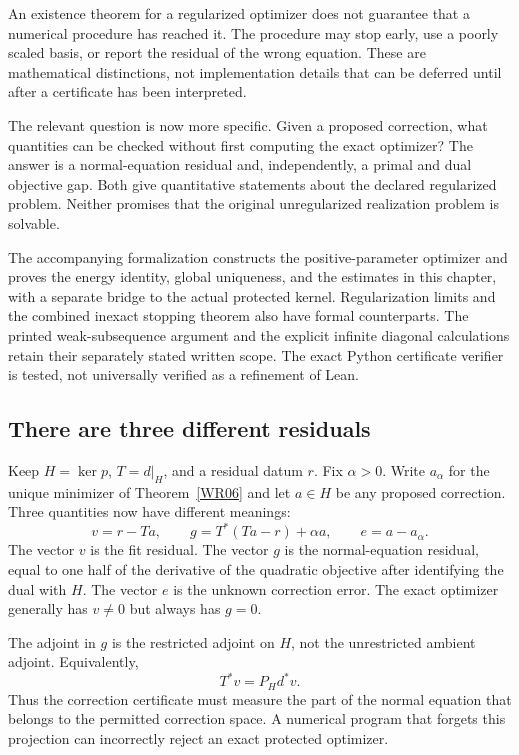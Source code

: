 \label{sec:inexact-repair}
An existence theorem for a regularized optimizer does not guarantee that a numerical procedure has reached it. The procedure may stop early, use a poorly scaled basis, or report the residual of the wrong equation. These are mathematical distinctions, not implementation details that can be deferred until after a certificate has been interpreted.

The relevant question is now more specific. Given a proposed correction, what quantities can be checked without first computing the exact optimizer? The answer is a normal-equation residual and, independently, a primal and dual objective gap. Both give quantitative statements about the declared regularized problem. Neither promises that the original unregularized realization problem is solvable.

\begin{scopebox}
The accompanying formalization constructs the positive-parameter optimizer and proves the energy identity, global uniqueness, and the estimates in this chapter, with a separate bridge to the actual protected kernel. Regularization limits and the combined inexact stopping theorem also have formal counterparts. The printed weak-subsequence argument and the explicit infinite diagonal calculations retain their separately stated written scope. The exact Python certificate verifier is tested, not universally verified as a refinement of Lean.
\end{scopebox}

\subsection{There are three different residuals}
Keep $H=\ker p$, $T=d|_H$, and a residual datum $r$. Fix $\alpha>0$. Write $a_\alpha$ for the unique minimizer of Theorem~\ref{WR06} and let $a\in H$ be any proposed correction. Three quantities now have different meanings:
\[
 v=r-Ta,\qquad
 g=T^*(Ta-r)+\alpha a,\qquad
 e=a-a_\alpha.
\]
The vector $v$ is the fit residual. The vector $g$ is the normal-equation residual, equal to one half of the derivative of the quadratic objective after identifying the dual with $H$. The vector $e$ is the unknown correction error. The exact optimizer generally has $v\ne0$ but always has $g=0$.

The adjoint in $g$ is the restricted adjoint on $H$, not the unrestricted ambient adjoint. Equivalently,
\[
 T^*v=P_Hd^*v.
\]
Thus the correction certificate must measure the part of the normal equation that belongs to the permitted correction space. A numerical program that forgets this projection can incorrectly reject an exact protected optimizer.

